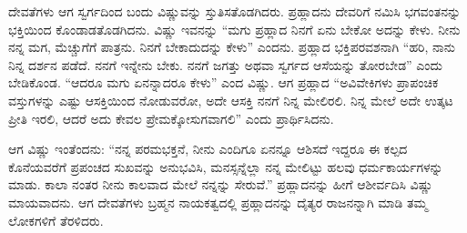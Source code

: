 ದೇವತೆಗಳು ಆಗ ಸ್ವರ್ಗದಿಂದ ಬಂದು ವಿಷ್ಣುವನ್ನು ಸ್ತುತಿಸತೊಡಗಿದರು. ಪ್ರಹ್ಲಾದನು ದೇವರಿಗೆ ನಮಿಸಿ ಭಗವಂತನನ್ನು ಭಕ್ತಿಯಿಂದ ಕೊಂಡಾಡತೊಡಗಿದನು. ವಿಷ್ಣು ಇವನನ್ನು “ಮಗು ಪ್ರಹ್ಲಾದ ನಿನಗೆ ಏನು ಬೇಕೋ ಅದನ್ನು ಕೇಳು. ನೀನು ನನ್ನ ಮಗ, ಮೆಚ್ಚುಗೆಗೆ ಪಾತ್ರನು. ನಿನಗೆ ಬೇಕಾದುದನ್ನು ಕೇಳು” ಎಂದನು. ಪ್ರಹ್ಲಾದ ಭಕ್ತಿಪರವಶನಾಗಿ “ಹರಿ, ನಾನು ನಿನ್ನ ದರ್ಶನ ಪಡೆದೆ. ನನಗೆ ಇನ್ನೇನು ಬೇಕು. ನನಗೆ ಜಗತ್ತು ಅಥವಾ ಸ್ವರ್ಗದ ಆಸೆಯನ್ನು ತೋರಬೇಡ” ಎಂದು ಬೇಡಿಕೊಂಡ. “ಆದರೂ ಮಗು ಏನನ್ನಾದರೂ ಕೇಳು” ಎಂದ ವಿಷ್ಣು. ಆಗ ಪ್ರಹ್ಲಾದ “ಅವಿವೇಕಿಗಳು ಪ್ರಾಪಂಚಿಕ ವಸ್ತುಗಳನ್ನು ಎಷ್ಟು ಆಸಕ್ತಿಯಿಂದ ನೋಡುವರೋ, ಅದೇ ಆಸಕ್ತಿ ನನಗೆ ನಿನ್ನ ಮೇಲಿರಲಿ. ನಿನ್ನ ಮೇಲೆ ಅದೇ ಉತ್ಕಟ ಪ್ರೀತಿ ಇರಲಿ, ಆದರೆ ಅದು ಕೇವಲ ಪ್ರೇಮಕ್ಕೋಸುಗವಾಗಲಿ” ಎಂದು ಪ್ರಾರ್ಥಿಸಿದನು.

ಆಗ ವಿಷ್ಣು ಇಂತೆಂದನು: “ನನ್ನ ಪರಮಭಕ್ತನೆ, ನೀನು ಎಂದಿಗೂ ಏನನ್ನೂ ಆಶಿಸದೆ ಇದ್ದರೂ ಈ ಕಲ್ಪದ ಕೊನೆಯವರೆಗೆ ಪ್ರಪಂಚದ ಸುಖವನ್ನು ಅನುಭವಿಸಿ, ಮನಸ್ಸನ್ನೆಲ್ಲಾ ನನ್ನ ಮೇಲಿಟ್ಟು ಹಲವು ಧರ್ಮಕಾರ್ಯಗಳನ್ನು ಮಾಡು. ಕಾಲಾ ನಂತರ ನೀನು ಕಾಲವಾದ ಮೇಲೆ ನನ್ನನ್ನು ಸೇರುವೆ.” ಪ್ರಹ್ಲಾದನನ್ನು ಹೀಗೆ ಆಶೀರ್ವದಿಸಿ ವಿಷ್ಣು ಮಾಯವಾದನು. ಆಗ ದೇವತೆಗಳು ಬ್ರಹ್ಮನ ನಾಯಕತ್ವದಲ್ಲಿ ಪ್ರಹ್ಲಾದನನ್ನು ದೈತ್ಯರ ರಾಜನನ್ನಾಗಿ ಮಾಡಿ ತಮ್ಮ ಲೋಕಗಳಿಗೆ ತೆರಳಿದರು.

